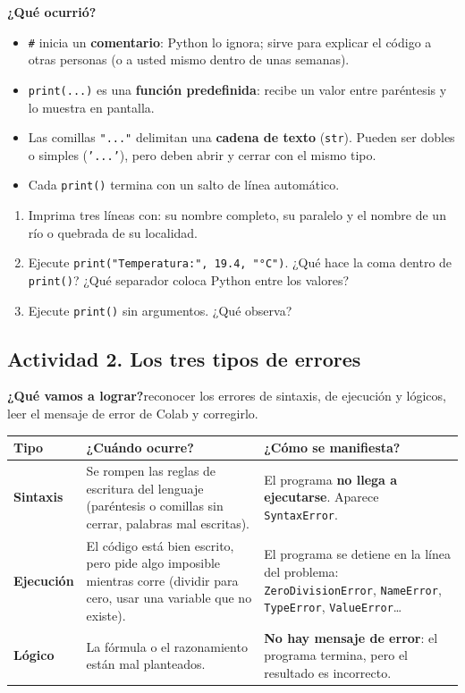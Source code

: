\documentclass[11pt,a4paper]{article}
\newcommand{\code}[1]{\texttt{#1}}
\newcommand{\actividad}[1]{\begin{objetivo}\textbf{\color{tealProfundo}¿Qué vamos a lograr?}\enspace #1\end{objetivo}}
\begin{document}
\textbf{¿Qué ocurrió?}
\begin{itemize}
  \item \code{\#} inicia un \textbf{comentario}: Python lo ignora; sirve para explicar el código a otras personas (o a usted mismo dentro de unas semanas).
  \item \code{print(...)} es una \textbf{función predefinida}: recibe un valor entre paréntesis y lo muestra en pantalla.
  \item Las comillas \code{"..."} delimitan una \textbf{cadena de texto} (\code{str}). Pueden ser dobles o simples (\code{'...'}), pero deben abrir y cerrar con el mismo tipo.
  \item Cada \code{print()} termina con un salto de línea automático.
\end{itemize}

\begin{experimente}
\begin{enumerate}[nosep]
  \item Imprima tres líneas con: su nombre completo, su paralelo y el nombre de un río o quebrada de su localidad.
  \item Ejecute \code{print("Temperatura:", 19.4, "°C")}. ¿Qué hace la coma dentro de \code{print()}? ¿Qué separador coloca Python entre los valores?
  \item Ejecute \code{print()} sin argumentos. ¿Qué observa?
\end{enumerate}
\end{experimente}

\subsection{Actividad 2. Los tres tipos de errores}
\actividad{reconocer los errores de sintaxis, de ejecución y lógicos, leer el mensaje de error de Colab y corregirlo.}

\begin{center}
\renewcommand{\arraystretch}{1.3}
\begin{tabularx}{\textwidth}{>{\bfseries}p{2.2cm} >{\raggedright\arraybackslash}X >{\raggedright\arraybackslash}X}
\toprule
Tipo & ¿Cuándo ocurre? & ¿Cómo se manifiesta? \\
\midrule
Sintaxis & Se rompen las reglas de escritura del lenguaje (paréntesis o comillas sin cerrar, palabras mal escritas). & El programa \textbf{no llega a ejecutarse}. Aparece \code{SyntaxError}. \\
Ejecución & El código está bien escrito, pero pide algo imposible mientras corre (dividir para cero, usar una variable que no existe). & El programa se detiene en la línea del problema: \code{ZeroDivisionError}, \code{NameError}, \code{TypeError}, \code{ValueError}\ldots \\
Lógico & La fórmula o el razonamiento están mal planteados. & \textbf{No hay mensaje de error}: el programa termina, pero el resultado es incorrecto. \\
\bottomrule
\end{tabularx}
\end{center}
\end{document}
